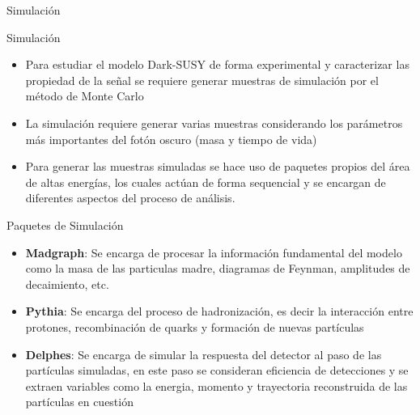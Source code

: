 \begin{frame}{}
    \begin{center}
        \LARGE Simulaci\'on
    \end{center}
\end{frame}


\begin{frame}{Simulaci\'on}

\begin{itemize}
    \item Para estudiar el modelo Dark-SUSY de forma experimental y caracterizar las propiedad de la se\~nal  
    se requiere generar muestras de simulaci\'on por el m\'etodo de Monte Carlo 
    \item La simulaci\'on requiere generar varias muestras considerando los par\'ametros m\'as importantes del fot\'on oscuro (masa y tiempo de vida) 
    \item Para generar las muestras simuladas se hace uso de paquetes propios del \'area de altas energ\'ias, los cuales act\'uan de forma sequencial y se encargan de diferentes aspectos del proceso de an\'alisis. 
\end{itemize}
    
\end{frame}


\begin{frame}{Paquetes de Simulaci\'on}
\begin{itemize}
    \item \textbf{Madgraph}: Se encarga de procesar la informaci\'on fundamental del modelo como la masa de las particulas madre, diagramas de Feynman, amplitudes de decaimiento, etc. 
    \item \textbf{Pythia}: Se encarga del proceso de hadronizaci\'on, es decir la interacci\'on entre protones, recombinaci\'on de quarks y formaci\'on de nuevas part\'iculas 
    \item \textbf{Delphes}: Se encarga de simular la respuesta del detector al paso de las part\'iculas simuladas, en este paso se consideran eficiencia de detecciones y se extraen variables como la energia, momento y trayectoria reconstruida de las part\'iculas en cuesti\'on
\end{itemize}

\end{frame}

